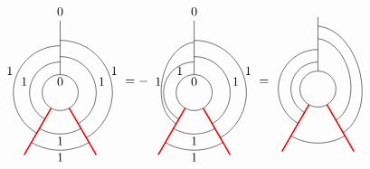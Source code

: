 	\begin{equation*}
		\begin{tikzpicture}[scale=1,baseline=(current bounding box.center)]
			\draw (0,0) circle (0.5cm);
			\draw[red,line width=0.4mm]
			\foreach \a in {-60, -120} {
				(\a:0.5) -- (\a:2)
			};
			\draw[] (90:0.5) -- (90:2);
			\draw ([shift=(-60:1cm)]0,0) arc (-60:90:1cm);
			\draw ([shift=(-120:1.15cm)]0,0) arc (-120:-60:1.15cm);
			\draw ([shift=(240:0.85cm)]0,0) arc (240:90:0.85cm);
			\draw ([shift=(240:1.3cm)]0,0) arc (240:90:1.3cm);
			\draw ([shift=(-60:1.45cm)]0,0) arc (-60:90:1.45cm);
			\draw ([shift=(-120:1.6cm)]0,0) arc (-120:-60:1.6cm);
			\node at (90:.3cm){$0$};\node at (90:2.25cm){$0$};
			\node at (-1,0.3) {$1$};
			\node at (1.15,0.3) {$1$};
			\node at (0,-1.35) {$1$};
			\node at (-1.4,0.6) {$1$};
			\node at (1.5,0.6) {$1$};
			\node at (0,-1.8) {$1$};
		\end{tikzpicture}
		=-\begin{tikzpicture}[scale=1,baseline=(current bounding box.center)]
			\draw (0,0) circle (0.5cm);
			\draw[red,line width=0.4mm]
			\foreach \a in {-60, -120} {
				(\a:0.5) -- (\a:2)
			};
			\draw[] (90:0.5) -- (90:2);
			\draw ([shift=(-60:1cm)]0,0) arc (-60:90:1cm);
			\draw ([shift=(-120:1.15cm)]0,0) arc (-120:-60:1.15cm);
			\draw ([shift=(240:0.85cm)]0,0) arc (240:90:0.85cm);
			\draw[] ([shift=(240:1.0cm)]0,0) to [bend left=70] ([shift=(90:1.4cm)]0,0);
			\draw ([shift=(-60:1.45cm)]0,0) arc (-60:90:1.45cm);
			\draw ([shift=(-120:1.6cm)]0,0) arc (-120:-60:1.6cm);
			\node at (90:.3cm){$0$};\node at (90:2.25cm){$0$};
			\node at (-1,0.3) {$1$};
			\node at (1.15,0.3) {$1$};
			\node at (0,-1.35) {$1$};
			\node at (-.4,0.6) {$1$};
			\node at (1.5,0.6) {$1$};
			\node at (0,-1.8) {$1$};
		\end{tikzpicture}
		=\begin{tikzpicture}[scale=1,baseline=(current bounding box.center)]
			\draw (0,0) circle (0.5cm);
			\draw[red,line width=0.4mm]
			\foreach \a in {-60, -120} {
				(\a:0.5) -- (\a:2)
			};
			\draw[] (90:0.5) -- (90:2);
			\draw ([shift=(240:0.75cm)]0,0) arc (240:90:0.75cm);
			\draw ([shift=(-60:1cm)]0,0) to [bend right=70] ([shift=(90:1.4cm)]0,0);
			\draw ([shift=(-120:1.5cm)]0,0) arc (-120:-60:1.5cm);
			\draw ([shift=(240:1.1cm)]0,0) arc (240:90:1.1cm);
			\draw ([shift=(-60:1.4cm)]0,0) to [bend right=70] ([shift=(90:1.75cm)]0,0);

\end{tikzpicture}
\end{equation*}
